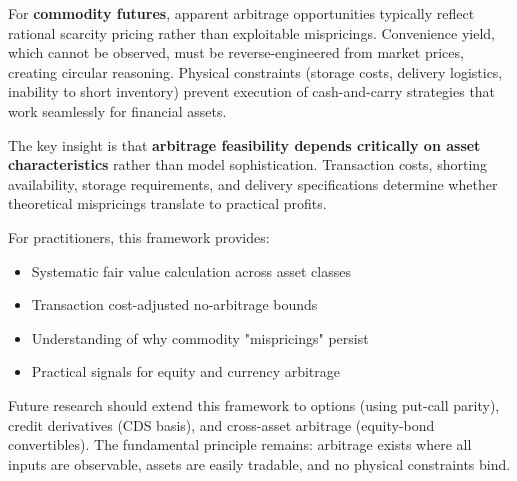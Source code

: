\documentclass[12pt,a4paper]{article}
\begin{document}
For \textbf{commodity futures}, apparent arbitrage opportunities typically reflect rational scarcity pricing rather than exploitable mispricings. Convenience yield, which cannot be observed, must be reverse-engineered from market prices, creating circular reasoning. Physical constraints (storage costs, delivery logistics, inability to short inventory) prevent execution of cash-and-carry strategies that work seamlessly for financial assets.

The key insight is that \textbf{arbitrage feasibility depends critically on asset characteristics} rather than model sophistication. Transaction costs, shorting availability, storage requirements, and delivery specifications determine whether theoretical mispricings translate to practical profits.

For practitioners, this framework provides:
\begin{itemize}
    \item Systematic fair value calculation across asset classes
    \item Transaction cost-adjusted no-arbitrage bounds
    \item Understanding of why commodity "mispricings" persist
    \item Practical signals for equity and currency arbitrage
\end{itemize}

Future research should extend this framework to options (using put-call parity), credit derivatives (CDS basis), and cross-asset arbitrage (equity-bond convertibles). The fundamental principle remains: arbitrage exists where all inputs are observable, assets are easily tradable, and no physical constraints bind.
\end{document}
